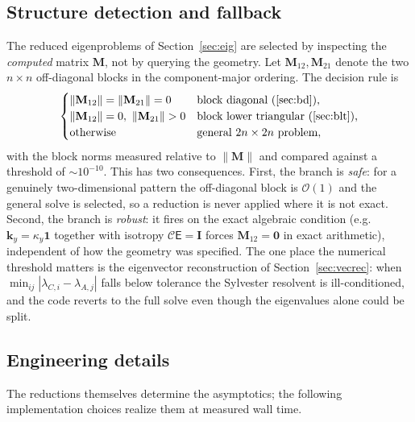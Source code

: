 \documentclass[11pt]{article}
\theoremstyle{remark}
\newcommand{\Cmat}{\mathcal{C}}
\newcommand{\epinv}{\mathsf{E}}
\newcommand{\kk}{\mathbf{k}}
\newcommand{\Id}{\mathbf{I}}
\newcommand{\order}{\mathcal{O}}
\begin{document}
\subsection{Structure detection and fallback}
\label{sec:blockdetection}

The reduced eigenproblems of Section~\ref{sec:eig} are selected by inspecting
the \emph{computed} matrix $\mathbf{M}$, not by querying the geometry.  Let
$\mathbf{M}_{12},\mathbf{M}_{21}$ denote the two $n\times n$ off-diagonal
blocks in the component-major ordering.  The decision rule is
\begin{equation}
\begin{cases}
\|\mathbf{M}_{12}\|=\|\mathbf{M}_{21}\|=0 & \text{block diagonal
(\cref{sec:bd}),}\\
\|\mathbf{M}_{12}\|=0,\ \|\mathbf{M}_{21}\|>0 & \text{block lower triangular
(\cref{sec:blt}),}\\
\text{otherwise} & \text{general } 2n\times2n \text{ problem},
\end{cases}
\label{eq:blockdetect}
\end{equation}
with the block norms measured relative to $\|\mathbf{M}\|$ and compared against
a threshold of $\sim10^{-10}$.  This has two consequences.  First, the branch
is \emph{safe}: for a genuinely two-dimensional pattern the off-diagonal block
is $\order(1)$ and the general solve is selected, so a reduction is never
applied where it is not exact.  Second, the branch is \emph{robust}: it fires
on the exact algebraic condition (e.g.\ $\kk_y=\kappa_y\mathbf{1}$ together
with isotropy $\Cmat\epinv=\Id$ forces $\mathbf{M}_{12}=\mathbf{0}$ in exact
arithmetic), independent of how the geometry was specified.  The one place the
numerical threshold matters is the eigenvector reconstruction of
Section~\ref{sec:vecrec}: when $\min_{ij}|\lambda_{C,i}-\lambda_{A,j}|$ falls
below tolerance the Sylvester resolvent is ill-conditioned, and the code
reverts to the full solve even though the eigenvalues alone could be split.

\subsection{Engineering details}

The reductions themselves determine the asymptotics; the following
implementation choices realize them at measured wall time.
\end{document}
